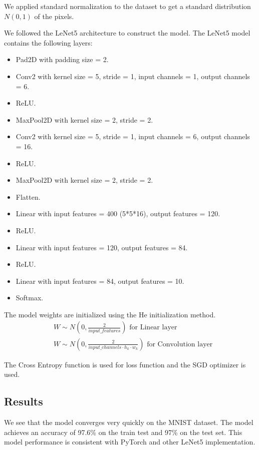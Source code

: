 \documentclass[conference]{IEEEtran}
\begin{document}
We applied standard normalization to the dataset to get a standard distribution \(N(0,1)\) of the pixels.

We followed the LeNet5 \cite{lenet} architecture to construct the model. The LeNet5 model contains the following layers:
\begin{itemize}
    \item Pad2D with padding size = 2.
    \item Conv2 with kernel size = 5, stride = 1, input channels = 1, output channels = 6.
    \item ReLU.
    \item MaxPool2D with kernel size = 2, stride = 2.
    \item Conv2 with kernel size = 5, stride = 1, input channels = 6, output channels = 16.
    \item ReLU.
    \item MaxPool2D with kernel size = 2, stride = 2.
    \item Flatten.
    \item Linear with input features = 400 (5*5*16), output features = 120.
    \item ReLU.
    \item Linear with input features = 120, output features = 84.
    \item ReLU.
    \item Linear with input features = 84, output features = 10.
    \item Softmax.
\end{itemize}

The model weights are initialized using the He \cite{he} initialization method.
\begin{equation}
\begin{split}
&W \sim N(0,\frac{2}{input\_features} ) \text{ for Linear layer}\\
&W \sim N(0,\frac{2}{input\_channels \cdot h_k \cdot w_k} ) \text{ for Convolution layer}
\end{split}
\end{equation}

The Cross Entropy function is used for loss function and the SGD optimizer is used.

\subsection{Results}
We see that the model converges very quickly on the MNIST dataset. The model achieves an accuracy of 97.6\% on the train test and 97\% on the test set. This model performance is consistent with PyTorch and other LeNet5 implementation.  
\end{document}
